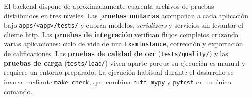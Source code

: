 El backend dispone de aproximadamente cuarenta archivos de pruebas
distribuidos en tres niveles. Las \textbf{pruebas unitarias} acompañan a
cada aplicación bajo \texttt{apps/<app>/tests/} y cubren modelos,
\textit{serializers} y servicios sin levantar el cliente \acs{http}.
Las \textbf{pruebas de integración}
verifican flujos completos cruzando varias aplicaciones: ciclo de vida
de una \texttt{ExamInstance}, corrección y exportación de calificaciones.
Las \textbf{pruebas de calidad de \acs{ocr}} (\texttt{tests/quality/}) y
las \textbf{pruebas de carga} (\texttt{tests/load/}) viven aparte porque
su ejecución es manual y requiere un entorno preparado. La ejecución
habitual durante el desarrollo se invoca mediante \texttt{make check},
que combina \texttt{ruff}, \texttt{mypy} y \texttt{pytest} en un único
comando.
